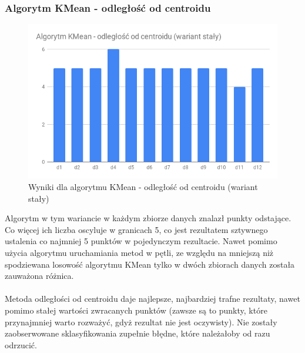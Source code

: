 \documentclass[eng,printmode]{mgr}
\begin{document}
\subsubsection{Algorytm KMean - odległość od centroidu}
\begin{figure}[H]
  \begin{center}
  \includegraphics[scale=0.7]{r_dist_f}
  \end{center}
  \caption{Wyniki dla algorytmu KMean - odległość od centroidu (wariant stały)}
  \label{fig:r_dist_f}
\end{figure}

Algorytm w tym wariancie w każdym zbiorze danych znalazł punkty odstające. Co więcej ich liczba oscyluje w granicach 5, co jest rezultatem sztywnego ustalenia co najmniej 5 punktów w pojedynczym rezultacie. Nawet pomimo użycia algorytmu uruchamiania metod w pętli, ze względu na mniejszą niż spodziewana losowość algorytmu KMean tylko w dwóch zbiorach danych została zauważona różnica.
\\\\
Metoda odległości od centroidu daje najlepsze, najbardziej trafne rezultaty, nawet pomimo stałej wartości zwracanych punktów (zawsze są to punkty, które przynajmniej warto rozważyć, gdyż rezultat nie jest oczywisty). Nie zostały zaobserwowane sklasyfikowania zupełnie błędne, które należałoby od razu odrzucić.
\end{document}
